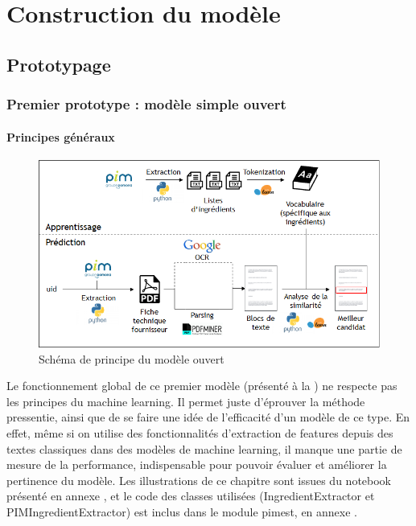 \part{Construction du modèle}

    \chapter{Prototypage}
    \label{prototypes}

    \section{Premier prototype : modèle simple \og ouvert \fg}
        
        \subsection{Principes généraux}

            \begin{figure}[htbp]
                \begin{center}
                \includegraphics[width=0.9\linewidth]{img/open_model.png}
                \end{center}
                \caption{Schéma de principe du \og modèle ouvert \fg}
                \label{fig:open_model}
            \end{figure}     

            Le fonctionnement global de ce premier modèle (présenté à la ) ne respecte pas les principes du machine learning.
            Il permet juste d'éprouver la méthode pressentie, ainsi que de se faire une idée de l'efficacité d'un modèle de ce type.
            En effet, même si on utilise des fonctionnalités d'extraction de features depuis des textes classiques dans des modèles de machine learning, il manque une partie de mesure de la performance, indispensable pour pouvoir évaluer et améliorer la pertinence du modèle.
            Les illustrations de ce chapitre sont issues du notebook présenté en annexe , et le code des classes utilisées (IngredientExtractor et PIMIngredientExtractor) est inclus dans le module pimest, en annexe .

